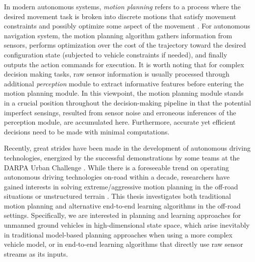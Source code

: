 \documentclass[../thesis.tex]{subfiles}
\begin{document}

In modern autonomous systems, \textit{motion planning} refers to a process where the desired movement task is broken into discrete motions that satisfy movement constraints and possibly optimize some aspect of the movement \cite{wiki:motion-planning}. 
For autonomous navigation system, the motion planning algorithm gathers information from sensors, performs optimization over the cost of the trajectory toward the desired configuration state (subjected to vehicle constraints if needed), and finally outputs the action commands for execution. 
It is worth noting that for complex decision making tasks, raw sensor information is usually processed through additional \textit{perception} module to extract informative features before entering the motion planning module.
In this viewpoint, the motion planning module stands in a crucial position throughout the decision-making pipeline in that the potential imperfect sensings, resulted from sensor noise and erroneous inferences of the perception module, are accumulated here. 
Furthermore, accurate yet efficient decisions need to be made with minimal computations.

Recently, great strides have been made in the development of autonomous driving technologies, energized by the successful demonstrations by some teams at the DARPA Urban Challenge \cite{boss, multimodaltartan}.
While there is a foreseeable trend on operating autonomous driving technologies on-road within a decade, researchers have gained interests in solving extreme/aggressive motion planning in the off-road situations or unstructured terrain \cite{williams2017information,kolter2010probabilistic,williams2016aggressive,gray2012predictive,cutler2016autonomous,cutler2014reinforcement}. 
This thesis investigates both traditional motion planning and alternative end-to-end learning algorithms in the off-road settings.
Specifically, we are interested in planning and learning approaches for unmanned ground vehicles in high-dimensional state space, which arise inevitably in traditional model-based planning approaches when using a more complex vehicle model, or in end-to-end learning algorithms that directly use raw sensor streams as its inputs.
\end{document}
